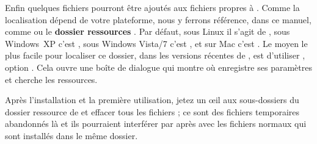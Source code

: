 Enfin quelques fichiers pourront être ajoutés aux fichiers \og propres\fg{} à \Tw. Comme la localisation dépend de votre plateforme, nous y ferrons référence, dans ce manuel, comme  ou le \textbf{dossier ressources \Tw}.
Par défaut, sous Linux il s'agit de , sous Windows~XP c'est , sous Windows Vista/7 c'est , et sur Mac c'est .
Le moyen le plus facile pour localiser ce dossier, dans les versions récentes de \Tw, est d'utiliser , option \submenu{}. Cela ouvre une boîte de dialogue qui montre où \Tw{} enregistre ses paramètres et cherche les ressources.

Après l'installation et la première utilisation, jetez un œil aux sous-dossiers du dossier ressource de \Tw{} et effacer tous les fichiers ; ce sont des fichiers temporaires abandonnés là et ils pourraient interférer par après avec les fichiers normaux qui sont installés dans le même dossier.
